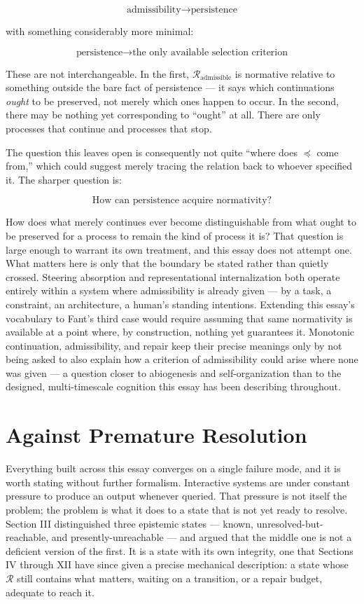 \documentclass[11pt]{article}
\newcommand{\adm}{\mathrm{admissible}}
\begin{document}
\[
\text{admissibility} \to \text{persistence}
\]

with something considerably more minimal:

\[
\text{persistence} \to \text{the only available selection criterion}
\]

These are not interchangeable. In the first, $\mathcal{R}_\adm$ is normative relative to something outside the bare fact of persistence --- it says which continuations \emph{ought} to be preserved, not merely which ones happen to occur. In the second, there may be nothing yet corresponding to ``ought'' at all. There are only processes that continue and processes that stop.

The question this leaves open is consequently not quite ``where does $\preceq$ come from,'' which could suggest merely tracing the relation back to whoever specified it. The sharper question is:

\[
\boxed{\text{How can persistence acquire normativity?}}
\]

How does what merely continues ever become distinguishable from what ought to be preserved for a process to remain the kind of process it is? That question is large enough to warrant its own treatment, and this essay does not attempt one. What matters here is only that the boundary be stated rather than quietly crossed. Steering absorption and representational internalization both operate entirely within a system where admissibility is already given --- by a task, a constraint, an architecture, a human's standing intentions. Extending this essay's vocabulary to Fant's third case would require assuming that same normativity is available at a point where, by construction, nothing yet guarantees it. Monotonic continuation, admissibility, and repair keep their precise meanings only by not being asked to also explain how a criterion of admissibility could arise where none was given --- a question closer to abiogenesis and self-organization than to the designed, multi-timescale cognition this essay has been describing throughout.

\section{Against Premature Resolution}

Everything built across this essay converges on a single failure mode, and it is worth stating without further formalism. Interactive systems are under constant pressure to produce an output whenever queried. That pressure is not itself the problem; the problem is what it does to a state that is not yet ready to resolve. Section III distinguished three epistemic states --- known, unresolved-but-reachable, and presently-unreachable --- and argued that the middle one is not a deficient version of the first. It is a state with its own integrity, one that Sections IV through XII have since given a precise mechanical description: a state whose $\mathcal{R}$ still contains what matters, waiting on a transition, or a repair budget, adequate to reach it.
\end{document}
